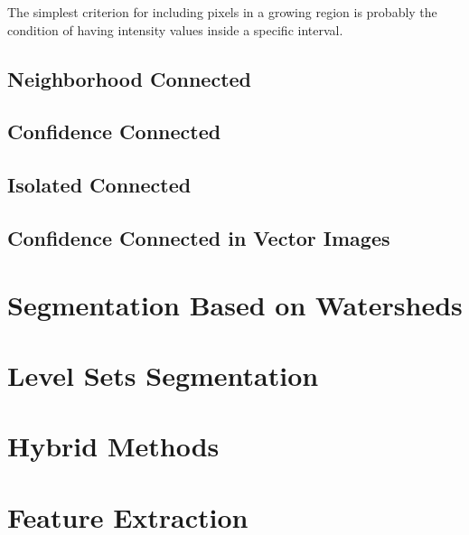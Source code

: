 The simplest criterion for including pixels in a growing region is
probably the condition of having intensity values inside a specific
interval.

\label{sec:ConnectedThreshold}
\ifitkFullVersion 

\fi


\subsection{Neighborhood Connected}
\label{sec:NeighborhoodConnectedImageFilter}
\ifitkFullVersion 

\fi



\subsection{Confidence Connected}
\label{sec:ConfidenceConnected}
\ifitkFullVersion 

\fi


\subsection{Isolated Connected}
\label{sec:IsolatedConnected}
\ifitkFullVersion 

\fi


\subsection{Confidence Connected in Vector Images}
\label{sec:VectorConfidenceConnected}
\ifitkFullVersion 

\fi


\section{Segmentation Based on Watersheds}
\label{sec:WatershedSegmentation}
\ifitkFullVersion 

\fi


\section{Level Sets Segmentation}
\label{sec:LevelSetsSegmentation}
\ifitkFullVersion 

\fi


\section{Hybrid Methods} 
\label{sec:HybridSegmentationMethods}

\ifitkFullVersion 

\fi


\section{Feature Extraction} 
\label{sec:FeatureExtractionMethods}

\ifitkFullVersion 

\fi


